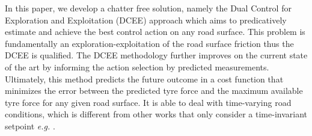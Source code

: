 \documentclass[onecolumn,journal,draftclsnofoot]{IEEEtran}
\begin{document}
 In this paper, we develop a chatter free solution, namely the Dual Control for Exploration and Exploitation (DCEE) approach which aims to predicatively estimate and achieve the best control action on any road surface.
 This problem is fundamentally an exploration-exploitation of the road surface friction thus the DCEE is qualified.
 The DCEE methodology further improves on the current state of the art by informing the action selection by predicted measurements. %
 Ultimately, this method predicts the future outcome in a cost function that minimizes the error between the predicted tyre force and the maximum available tyre force for any given road surface. 
It is able to deal with time-varying road conditions, which is different from other works  that only consider a time-invariant setpoint \emph{e.g.} \cite{Shaohua2022}.

\end{document}
